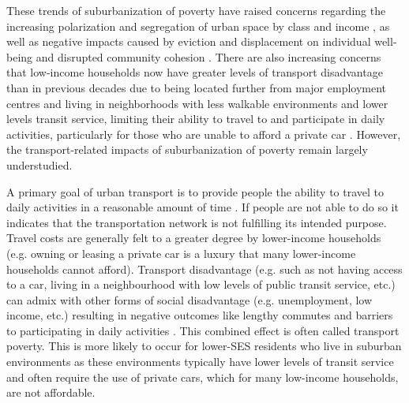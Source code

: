 These trends of suburbanization of poverty have raised concerns regarding the increasing polarization and segregation of urban space by class and income \cite{hulchanski_three_2010,walks_income_2013,ades_are_2012}, as well as negative impacts caused by eviction and displacement on individual well-being and disrupted community cohesion \cite{august_challenging_2014,august_its_2016}. There are also increasing concerns that low-income households now have greater levels of transport disadvantage than in previous decades due to being located further from major employment centres and living in neighborhoods with less walkable environments and lower levels transit service, limiting their ability to travel to and participate in daily activities, particularly for those who are unable to afford a private car \cite{skaburskis_filtering_2014,ades_are_2012}. However, the transport-related impacts of suburbanization of poverty remain largely understudied.




A primary goal of urban transport is to provide people the ability to travel to daily activities in a reasonable amount of time \cite{martens_transport_2016}. If people are not able to do so it indicates that the transportation network is not fulfilling its intended purpose. Travel costs are generally felt to a greater degree by lower-income households (e.g. owning or leasing a private car is a luxury that many lower-income households cannot afford). Transport disadvantage (e.g. such as not having access to a car, living in a neighbourhood with low levels of public transit service, etc.) can admix with other forms of social disadvantage (e.g. unemployment, low income, etc.) resulting in negative outcomes like lengthy commutes and barriers to participating in daily activities . This combined effect is often called transport poverty. This is more likely to occur for lower-SES residents who live in suburban environments as these environments typically have lower levels of transit service and often require the use of private cars, which for many low-income households, are not affordable.


